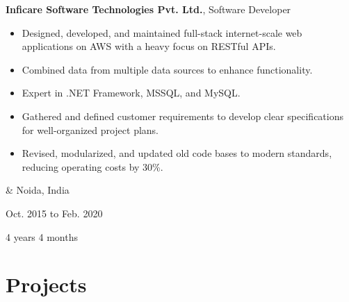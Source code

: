 \documentclass[10pt, letterpaper]{article}
\newenvironment{highlights}{
        \begin{itemize}[
                topsep=0pt,
                parsep=0.10cm,
                partopsep=0pt,
                itemsep=0pt,
                after=\vspace{-1\baselineskip},
                leftmargin=0.4cm + 3pt
            ]
    }{
        \end{itemize}
    } %
\let\originalTabularx\tabularx
\let\originalEndTabularx\endtabularx
\renewenvironment{tabularx}{\bgroup\centering\originalTabularx}{\originalEndTabularx\par\egroup}
\begin{document}
        \vspace{0.2cm}
        \begin{tabularx}{
            \textwidth-0.4 cm-0.13cm
        }{
            K{0.2cm}
            R{4.1cm}
        }
            \textbf{Inficare Software Technologies Pvt. Ltd.}, Software Developer

            \vspace{0.10cm}

            \begin{highlights}
                \item Designed, developed, and maintained full-stack internet-scale web applications on AWS with a heavy focus on RESTful APIs.
                \item Combined data from multiple data sources to enhance functionality.
                \item Expert in .NET Framework, MSSQL, and MySQL.
                \item Gathered and defined customer requirements to develop clear specifications for well-organized project plans.
                \item Revised, modularized, and updated old code bases to modern standards, reducing operating costs by 30\%.
            \end{highlights}
            &
            Noida, India

            Oct. 2015 to Feb. 2020

            4 years 4 months
        \end{tabularx}


    
    \section{Projects}
\end{document}
